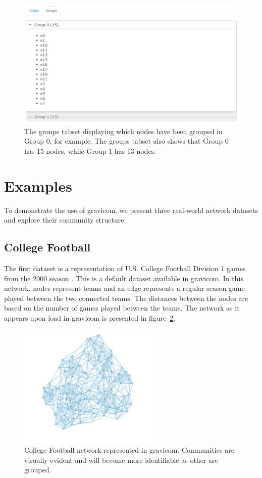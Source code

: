 \documentclass{article}\usepackage[]{graphicx}\usepackage[]{color}
\begin{document}
\begin{figure}[H]
\centering
\includegraphics[width=\textwidth]{images/groupstab.png}
\caption{\label{fig:groupstab} The groups tabset displaying which nodes have been grouped in Group 0, for example. The groups tabset also shows that Group 0 has 15 nodes, while Group 1 has 13 nodes.}
\end{figure}


\section{Examples}

To demonstrate the use of gravicom, we present three real-world network datasets and explore their community structure.

\subsection{College Football}
The first dataset is a representation of U.S. College Football Division 1 games from the 2000 season \cite{gn-football}. This is a default dataset available in gravicom. In this network, nodes represent teams and an edge represents a regular-season game played between the two connected teams. The distances between the nodes are based on the number of games played between the teams. The network as it appears upon load in gravicom is presented in figure~\ref{fig:football_1}. 

\begin{figure}[H]
\centering
\includegraphics[width=0.6\textwidth]{images/football_1.png}
\caption{\label{fig:football_1} College Football network represented in gravicom. Communities are visually evident and will become more identifiable as other are grouped.}
\end{figure}
\end{document}
